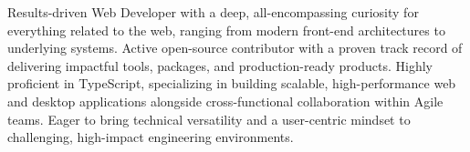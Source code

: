 
\begin{cvparagraph}

Results-driven Web Developer with a deep, all-encompassing curiosity for everything related to the web, ranging from modern front-end architectures to underlying systems. Active open-source contributor with a proven track record of delivering impactful tools, packages, and production-ready products. Highly proficient in TypeScript, specializing in building scalable, high-performance web and desktop applications alongside cross-functional collaboration within Agile teams. Eager to bring technical versatility and a user-centric mindset to challenging, high-impact engineering environments.

\end{cvparagraph}
